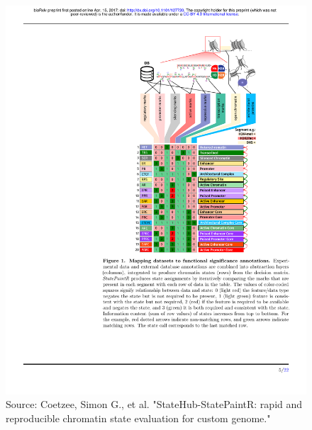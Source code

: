 \documentclass[slidestop,compress,11pt,xcolor=dvipsnames]{beamer}
\begin{document}
\begin{frame}[plain]%
\vspace*{-0.5cm}
\begin{figure}
 \centering
 \includegraphics[width=0.5\linewidth]{intro/states.pdf}{\tiny{\\Source: Coetzee, Simon G., et al. "StateHub-StatePaintR: rapid and reproducible chromatin state evaluation for custom genome."}}
\end{figure}
\end{frame}
\end{document}
